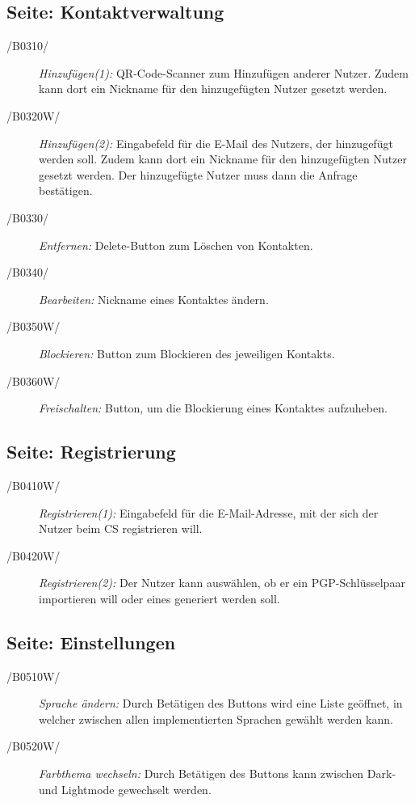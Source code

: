 \subsection{Seite: Kontaktverwaltung}
		\begin{description}
			\item[/B0310/]
				\textit{Hinzufügen(1):}
					\textnormal{QR-Code-Scanner zum Hinzufügen anderer Nutzer. Zudem kann dort ein Nickname für den hinzugefügten Nutzer gesetzt werden.}
			\item[/B0320W/]
				\textit{Hinzufügen(2):}
					\textnormal{Eingabefeld für die E-Mail des Nutzers, der hinzugefügt werden soll. Zudem kann dort ein Nickname für den hinzugefügten Nutzer gesetzt werden. Der hinzugefügte Nutzer muss dann die Anfrage bestätigen.}
			\item[/B0330/]
				\textit{Entfernen:}
					\textnormal{Delete-Button zum Löschen von Kontakten.}
			\item[/B0340/]
				\textit{Bearbeiten:}
					\textnormal{Nickname eines Kontaktes ändern.}
			\item[/B0350W/]
				\textit{Blockieren:}
					\textnormal{Button zum Blockieren des jeweiligen Kontakts.}
			\item[/B0360W/]
				\textit{Freischalten:}
					\textnormal{Button, um die Blockierung eines Kontaktes aufzuheben.}
		\end{description}
\subsection{Seite: Registrierung}
			\begin{description}
				\item[/B0410W/]
					\textit{Registrieren(1):}
                        \textnormal{Eingabefeld für die E-Mail-Adresse, mit der sich der Nutzer beim \ac{CS} registrieren will.}
				\item[/B0420W/]	
					\textit{Registrieren(2):}
						\textnormal{Der Nutzer kann auswählen, ob er ein PGP-Schlüsselpaar importieren will oder eines generiert werden soll.}
			\end{description}
\subsection{Seite: Einstellungen}
			\begin{description}
			\item[/B0510W/]
				\textit{Sprache ändern:}
					\textnormal{Durch Betätigen des Buttons wird eine Liste geöffnet, in welcher zwischen allen implementierten Sprachen gewählt werden kann.}
			\item[/B0520W/]
				\textit{Farbthema wechseln:}
					\textnormal{Durch Betätigen des Buttons kann zwischen Dark- und Lightmode gewechselt werden.}
			\end{description}
			






